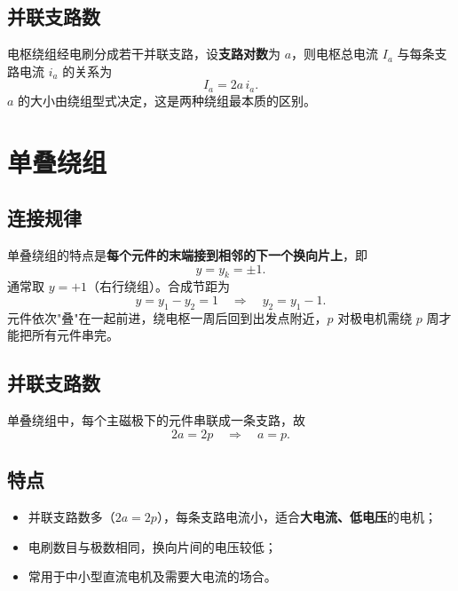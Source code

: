 \subsection{并联支路数}
电枢绕组经电刷分成若干并联支路，设\textbf{支路对数}为 $a$，则电枢总电流 $I_a$ 与每条支路电流 $i_a$ 的关系为
\begin{equation}
I_a=2a\,i_a .
\end{equation}
$a$ 的大小由绕组型式决定，这是两种绕组最本质的区别。

\section{单叠绕组}

\subsection{连接规律}
单叠绕组的特点是\textbf{每个元件的末端接到相邻的下一个换向片上}，即
\begin{equation}
y=y_k=\pm1 .
\end{equation}
通常取 $y=+1$（右行绕组）。合成节距为
\begin{equation}
y=y_1-y_2=1\quad\Longrightarrow\quad y_2=y_1-1 .
\end{equation}
元件依次"叠"在一起前进，绕电枢一周后回到出发点附近，$p$ 对极电机需绕 $p$ 周才能把所有元件串完。

\subsection{并联支路数}
单叠绕组中，每个主磁极下的元件串联成一条支路，故
\begin{equation}
2a=2p\quad\Longrightarrow\quad a=p .
\end{equation}


\subsection{特点}
\begin{itemize}
  \item 并联支路数多（$2a=2p$），每条支路电流小，适合\textbf{大电流、低电压}的电机；
  \item 电刷数目与极数相同，换向片间的电压较低；
  \item 常用于中小型直流电机及需要大电流的场合。
\end{itemize}

